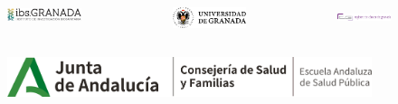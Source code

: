 \documentclass{beamer}
\begin{document}
\begin{frame}[fragile]
	\begin{columns}
		\begin{column}{0.33\textwidth}
			\begin{figure}
				\centering
				\includegraphics[width=.9\textwidth]{logos/logo_ibs.jpg}
			\end{figure}
		\end{column}
		\begin{column}{0.33\textwidth}
			\begin{figure}
				\centering
				\includegraphics[width=.8\textwidth]{logos/logo_ugr.png}
			\end{figure}
		\end{column}
		\begin{column}{0.33\textwidth}
			\begin{figure}
				\centering
				\includegraphics[width=.9\textwidth]{logos/logo_RCG.png}
			\end{figure}
		\end{column}
	\end{columns}
	\begin{columns}
		\begin{column}{0.33\textwidth}
			\begin{figure}
				\centering
				\includegraphics[width=1\textwidth]{logos/logo_easp.png}
			\end{figure}
		\end{column}
		\begin{column}{0.33\textwidth}

\end{column}
\end{columns}
\end{frame}
\end{document}
